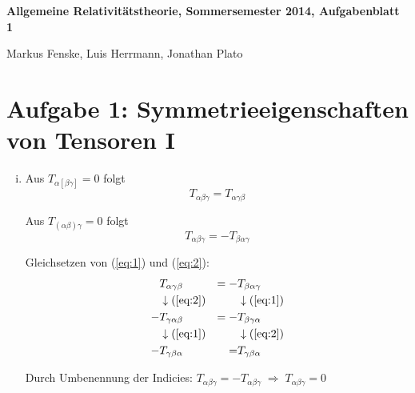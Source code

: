 \documentclass[a4paper,german,12pt,smallheadings]{scrartcl}
\begin{document}
\allowdisplaybreaks %
\begin{center}
\bfseries %
\sffamily %
\vspace{-40pt}
Allgemeine Relativitätstheorie, Sommersemester 2014, Aufgabenblatt 1

Markus Fenske, Luis Herrmann, Jonathan Plato
\vspace{-10pt}
\end{center}

\section*{Aufgabe 1: Symmetrieeigenschaften von Tensoren I}

\begin{enumerate}[i)]
  \item
    Aus $T_{\alpha [\beta \gamma]} = 0$ folgt
    \begin{equation}
      T_{\alpha \beta \gamma} = T_{\alpha \gamma \beta}
      \label{eq:1}
    \end{equation}

    Aus $T_{(\alpha \beta) \gamma} = 0$ folgt
    \begin{equation}
      T_{\alpha \beta \gamma} = -T_{\beta \alpha \gamma}
      \label{eq:2}
    \end{equation}

    Gleichsetzen von (\ref{eq:1}) und (\ref{eq:2}):
    \begin{align*}
      &T_{\alpha \gamma \beta}          &= -&T_{\beta \alpha \gamma}          \\
      &\downarrow \text{(\ref{eq:2})}   &   &\downarrow \text{(\ref{eq:1})}   \\
     -&T_{\gamma \alpha \beta}          &= -&T_{\beta \gamma \alpha}          \\
      &\downarrow \text{(\ref{eq:1})}   &   &\downarrow \text{(\ref{eq:2})}   \\
     -&T_{\gamma \beta \alpha}          &=  &T_{\gamma \beta \alpha}          \\
    \end{align*}

    Durch Umbenennung der Indicies: $T_{\alpha \beta \gamma} = -T_{\alpha \beta \gamma} \;\Rightarrow\; T_{\alpha \beta \gamma} = 0$
\end{enumerate}
\end{document}

